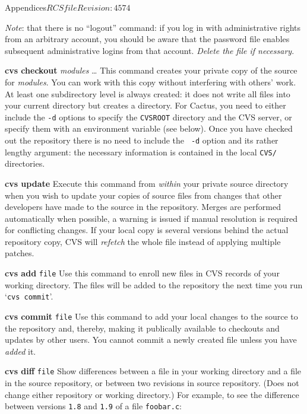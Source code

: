 \begin{cactuspart}{Appendices}{$RCSfile$}{$Revision: 4574 $}
\begin{Lentry}
\emph{Note}: that there is no ``logout'' command: if you log in with
administrative rights from an arbitrary account, you should be aware
that the password file enables subsequent administrative logins from
that account. \emph{Delete the file if necessary}.

\item[{\bf cvs checkout} \textit{modules} \ldots]
This command  creates
your private copy of the source for \textit{modules}. You can work
with this copy  without  interfering  with  others'
work.   At  least  one subdirectory level is always created: it does
not write all files into your current directory but creates a
directory. For Cactus, you need to either include the {\tt -d} options to
specify the {\tt CVSROOT} directory and the CVS server, or specify them
with an environment variable (see below). Once you
have checked out the repository there is no need to include the {\tt
-d} option and its rather lengthy argument: the necessary information
is contained in the local {\tt CVS/} directories.

\item[{\bf cvs update}]
Execute  this  command  from  \emph{within}  your  private
source  directory  when  you  wish  to  update your
copies of source  files  from  changes  that  other
developers have made to the source in the repository.
Merges are performed automatically when possible, a warning is issued
if manual  resolution  is  required  for conflicting  changes. If your
local copy is several versions behind the actual repository copy, CVS
will \emph{refetch} the whole file instead of applying multiple
patches.

\item[{\bf cvs add} {\tt file}]
Use this command to enroll new files in CVS records
of your working directory.  The files will be added
to the  repository  the  next  time  you  run  `{\tt cvs
commit}'.

\item[{\bf cvs commit} {\tt file}]
Use this command to add your local changes to the source to
the repository and, thereby, making it publically available to
checkouts and updates by other users. You cannot commit a
newly created file unless you have \emph{added} it.

\item[{\bf cvs diff} {\tt file}]
Show differences between a file in your working directory
and  a file in the source repository, or between two revisions in
source repository.  (Does not change either repository or working
directory.) For example, to see the difference between versions
{\tt 1.8} and {\tt 1.9} of a file {\tt foobar.c}:


\end{Lentry}
\end{cactuspart}
